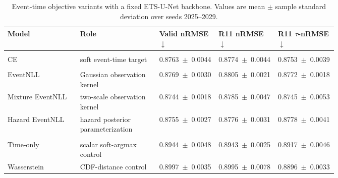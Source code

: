 \documentclass[12pt]{article}
\begin{document}
\begin{table}[!t]
\centering
\caption{Event-time objective variants with a fixed ETS-U-Net backbone. Values are mean $\pm$ sample standard deviation over seeds 2025--2029.}
\label{tab:r11_segmentation_losses}
\footnotesize
\setlength{\tabcolsep}{2pt}
\renewcommand{\arraystretch}{1.15}
\begin{tabularx}{\linewidth}{@{} >{\RaggedRight\arraybackslash}p{0.22\linewidth} Y >{\centering\arraybackslash}p{0.18\linewidth} >{\centering\arraybackslash}p{0.18\linewidth} >{\centering\arraybackslash}p{0.18\linewidth} @{}}
\toprule
\textbf{Model} & \textbf{Role} & \textbf{Valid nRMSE} $\downarrow$ & \textbf{R11 nRMSE} $\downarrow$ & \textbf{R11 \(\tau\)-nRMSE} $\downarrow$ \\
\midrule
{} \\
\addlinespace[0.15em]
CE & soft event-time target & \mbox{0.8763 $\pm$ 0.0044} & \mbox{0.8774 $\pm$ 0.0044} & \mbox{0.8753 $\pm$ 0.0039} \\
\midrule
{} \\
\addlinespace[0.15em]
EventNLL & Gaussian observation kernel & \mbox{0.8769 $\pm$ 0.0030} & \mbox{0.8805 $\pm$ 0.0021} & \mbox{0.8772 $\pm$ 0.0018} \\
Mixture EventNLL & two-scale observation kernel & \mbox{0.8744 $\pm$ 0.0018} & \mbox{0.8785 $\pm$ 0.0047} & \mbox{0.8745 $\pm$ 0.0053} \\
Hazard EventNLL & hazard posterior parameterization & \mbox{0.8755 $\pm$ 0.0027} & \mbox{0.8776 $\pm$ 0.0031} & \mbox{0.8778 $\pm$ 0.0041} \\
\midrule
{} \\
\addlinespace[0.15em]
Time-only & scalar soft-argmax control & \mbox{0.8944 $\pm$ 0.0048} & \mbox{0.8943 $\pm$ 0.0025} & \mbox{0.8917 $\pm$ 0.0046} \\
Wasserstein & CDF-distance control & \mbox{0.8997 $\pm$ 0.0035} & \mbox{0.8995 $\pm$ 0.0078} & \mbox{0.8896 $\pm$ 0.0033} \\
\bottomrule
\end{tabularx}
\end{table}
\end{document}
